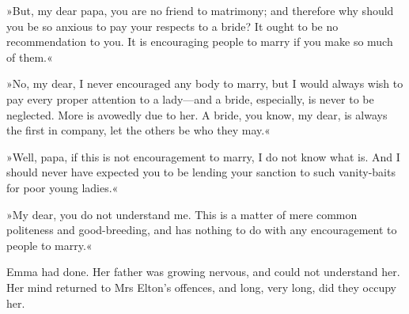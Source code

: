 »But, my dear papa, you are no friend to matrimony; and therefore why should you be so anxious to pay your respects to a bride? It ought to be no recommendation to you. It is encouraging people to marry if you make so much of them.«

»No, my dear, I never encouraged any body to marry, but I would always wish to pay every proper attention to a lady—and a bride, especially, is never to be neglected. More is avowedly due to her. A bride, you know, my dear, is always the first in company, let the others be who they may.«

»Well, papa, if this is not encouragement to marry, I do not know what is. And I should never have expected you to be lending your sanction to such vanity-baits for poor young ladies.«

»My dear, you do not understand me. This is a matter of mere common politeness and good-breeding, and has nothing to do with any encouragement to people to marry.«

Emma had done. Her father was growing nervous, and could not understand her. Her mind returned to Mrs Elton's offences, and long, very long, did they occupy her.